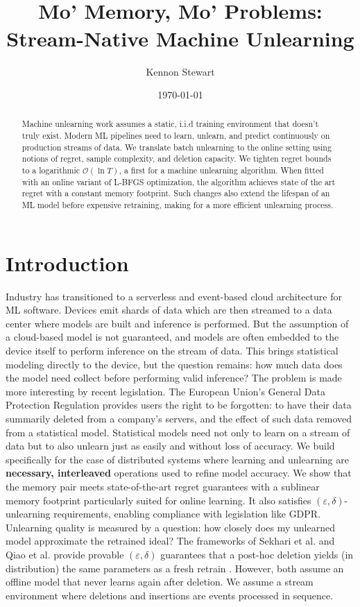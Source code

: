 \documentclass{article}
\title{
    \institutionlogo\\[1cm]
    {\bfseries\color{sslblue} Mo' Memory, Mo' Problems: Stream-Native Machine Unlearning}
}
\author[1, 2]{Kennon Stewart}
\affil[1]{Second Street Labs;
Detroit, MI}
\affil[2]{University of Michigan; Ann Arbor, MI}
\affil[ ]{\texttt{kennon@secondstreetlabs.io}}
\date{\today}
\theoremstyle{ssltheorem}
\begin{document}
\maketitle

\begin{abstract}
Machine unlearning work assumes a static, i.i.d training environment that doesn't truly exist.
Modern ML pipelines need to learn, unlearn, and predict continuously on production streams of data.
We translate batch unlearning to the online setting using notions of regret, sample complexity, and deletion capacity.
We tighten regret bounds to a logarithmic $\mathcal{O}(\ln{T})$, a first for a machine unlearning algorithm.
When fitted with an online variant of L-BFGS optimization, the algorithm achieves state of the art regret with a constant memory footprint.
Such changes also extend the lifespan of an ML model before expensive retraining, making for a more efficient unlearning process.
\end{abstract}

\section{Introduction}
\label{sec:intro}

Industry has transitioned to a serverless and event-based cloud architecture for ML software.
Devices emit shards of data which are then streamed to a data center where models are built and inference is performed.
But the assumption of a cloud-based model is not guaranteed, and models are often embedded to the device itself to perform inference on the stream of data.
This brings statistical modeling directly to the device, but the question remains: how much data does the model need collect before performing valid inference?
The problem is made more interesting by recent legislation. The European Union's General Data Protection Regulation provides users the right to be forgotten: to have their data summarily deleted from a company's servers, and the effect of such data removed from a statistical model.
Statistical models need not only to learn on a stream of data but to also unlearn just as easily and without loss of accuracy.
We build specifically for the case of distributed systems where learning and unlearning are \textbf{necessary, interleaved} operations used to refine model accuracy.
We show that the memory pair meets state-of-the-art regret guarantees with a sublinear memory footprint particularly suited for online learning.
It also satisfies $(\varepsilon,\delta)$-unlearning requirements, enabling compliance with legislation like GDPR.
Unlearning quality is measured by a question: how closely does my unlearned model approximate the retrained ideal?
The frameworks of Sekhari et al. and Qiao et al.
provide provable $(\varepsilon,\delta)$ guarantees that a post-hoc deletion yields (in distribution) the same parameters as a fresh retrain \cite{Sekhari_Acharya_Kamath_Suresh_2021-03}.
However, both assume an offline model that never learns again after deletion.
We assume a stream environment where deletions and insertions are events processed in sequence.
\end{document}

